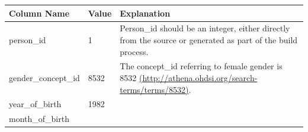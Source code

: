 \documentclass[]{book}
\begin{document}
\begin{longtable}[]{@{}lll@{}}
\toprule
\begin{minipage}[b]{0.33\columnwidth}\raggedright\strut
Column Name\strut
\end{minipage} & \begin{minipage}[b]{0.16\columnwidth}\raggedright\strut
Value\strut
\end{minipage} & \begin{minipage}[b]{0.42\columnwidth}\raggedright\strut
Explanation\strut
\end{minipage}\tabularnewline
\midrule
\endhead
\begin{minipage}[t]{0.33\columnwidth}\raggedright\strut
person\_id\strut
\end{minipage} & \begin{minipage}[t]{0.16\columnwidth}\raggedright\strut
1\strut
\end{minipage} & \begin{minipage}[t]{0.42\columnwidth}\raggedright\strut
Person\_id should be an integer, either directly from the source or
generated as part of the build process.\strut
\end{minipage}\tabularnewline
\begin{minipage}[t]{0.33\columnwidth}\raggedright\strut
gender\_concept\_id\strut
\end{minipage} & \begin{minipage}[t]{0.16\columnwidth}\raggedright\strut
8532\strut
\end{minipage} & \begin{minipage}[t]{0.42\columnwidth}\raggedright\strut
The concept\_id referring to female gender is 8532
\href{http://athena.ohdsi.org/search-terms/terms/8532}{(http://athena.ohdsi.org/search-terms/terms/8532)}.\strut
\end{minipage}\tabularnewline
\begin{minipage}[t]{0.33\columnwidth}\raggedright\strut
year\_of\_birth\strut
\end{minipage} & \begin{minipage}[t]{0.16\columnwidth}\raggedright\strut
1982\strut
\end{minipage} & \begin{minipage}[t]{0.42\columnwidth}\raggedright\strut
\strut
\end{minipage}\tabularnewline
\begin{minipage}[t]{0.33\columnwidth}\raggedright\strut
month\_of\_birth\strut
\end{minipage} & \begin{minipage}[t]{0.16\columnwidth}\raggedright\strut

\end{minipage}
\end{longtable}
\end{document}
